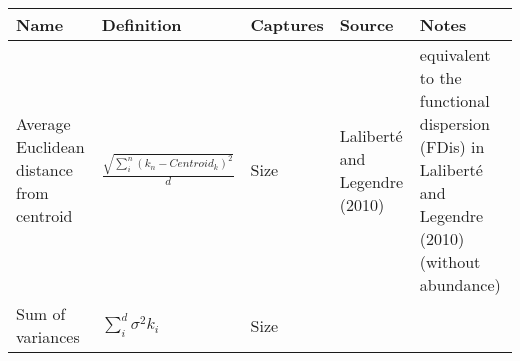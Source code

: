 \documentclass[]{article}
\begin{document}
\begin{longtable}[]{@{}lllll@{}}
\toprule
\begin{minipage}[b]{0.08\columnwidth}\raggedright\strut
Name\strut
\end{minipage} & \begin{minipage}[b]{0.16\columnwidth}\raggedright\strut
Definition\strut
\end{minipage} & \begin{minipage}[b]{0.13\columnwidth}\raggedright\strut
Captures\strut
\end{minipage} & \begin{minipage}[b]{0.11\columnwidth}\raggedright\strut
Source\strut
\end{minipage} & \begin{minipage}[b]{0.11\columnwidth}\raggedright\strut
Notes\strut
\end{minipage}\tabularnewline
\midrule
\endhead
\begin{minipage}[t]{0.08\columnwidth}\raggedright\strut
Average Euclidean distance from centroid\strut
\end{minipage} & \begin{minipage}[t]{0.16\columnwidth}\raggedright\strut
\(\frac{\sqrt{\sum_{i}^{n}{({k}_{n}-Centroid_{k})^2}}}{d}\)\strut
\end{minipage} & \begin{minipage}[t]{0.13\columnwidth}\raggedright\strut
Size\strut
\end{minipage} & \begin{minipage}[t]{0.11\columnwidth}\raggedright\strut
Laliberté and Legendre (2010)\strut
\end{minipage} & \begin{minipage}[t]{0.11\columnwidth}\raggedright\strut
equivalent to the functional dispersion (FDis) in Laliberté and Legendre
(2010) (without abundance)\strut
\end{minipage}\tabularnewline
\begin{minipage}[t]{0.08\columnwidth}\raggedright\strut
Sum of variances\strut
\end{minipage} & \begin{minipage}[t]{0.16\columnwidth}\raggedright\strut
\(\sum_{i}^{d}{\sigma^{2}{k_i}}\)\strut
\end{minipage} & \begin{minipage}[t]{0.13\columnwidth}\raggedright\strut
Size\strut
\end{minipage} & \begin{minipage}[t]{0.11\columnwidth}\raggedright\strut

\end{minipage}
\end{longtable}
\end{document}
